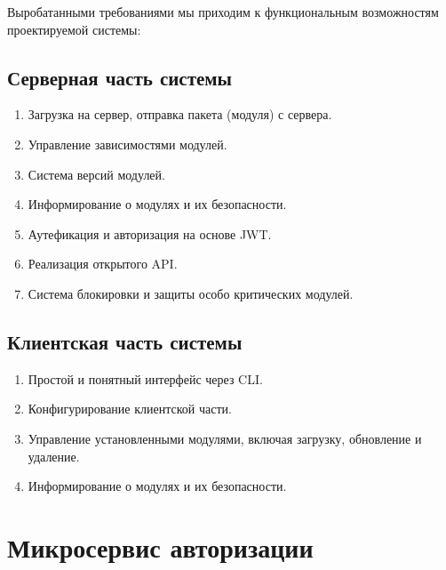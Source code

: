 Выробатанными требованиями мы приходим к функциональным возможностям проектируемой системы:

\subsection{Серверная часть системы}

\begin{enumerate}
    \item Загрузка на сервер, отправка пакета (модуля) с сервера.
    \item Управление зависимостями модулей.
    \item Система версий модулей.
    \item Информирование о модулях и их безопасности.
    \item Аутефикация и авторизация на основе JWT.
    \item Реализация открытого API.
    \item Система блокировки и защиты особо критических модулей.
\end{enumerate}



\subsection{Клиентская часть системы}

\begin{enumerate}
    \item Простой и понятный интерфейс через CLI.
    \item Конфигурирование клиентской части.
    \item Управление установленными модулями, включая загрузку, обновление и удаление.
    \item Информирование о модулях и их безопасности.
\end{enumerate}

\section{Микросервис авторизации}

